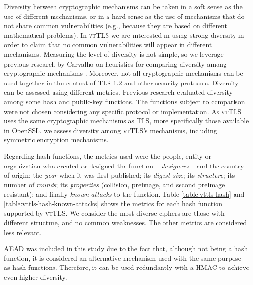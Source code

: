 \documentclass{sig-alternate-05-2015}
\begin{document}
Diversity between cryptographic mechanisms can be taken in a soft sense as the use of different mechanisms, or in a hard sense as the use of mechanisms that do not share common vulnerabilities (e.g., because they are based on different mathematical problems). In \textsc{vtTLS} we are interested in using strong diversity in order to claim that no common vulnerabilities will appear in different mechanisms. Measuring the level of diversity is not simple, so we leverage previous research by Carvalho on heuristics for comparing diversity among  cryptographic mechanisms \cite{CarvalhoThesis14}. Moreover, not all cryptographic mechanisms can be used together in the context of TLS 1.2 and other security protocols. 
Diversity can be assessed using different metrics. Previous research evaluated diversity among some hash and public-key functions. The functions subject to comparison were not chosen considering any specific protocol or implementation.
As \textsc{vtTLS} uses the same cryptographic mechanisms as TLS, more specifically those available in OpenSSL, we assess diversity among \textsc{vtTLS}'s mechanisms, including symmetric encryption mechanisms.


Regarding hash functions, the metrics used were the people, entity or organization who created or designed the function -- \textit{designers} -- and the country of origin; the \textit{year} when it was first published; its \textit{digest size}; its \textit{structure}; its number of \textit{rounds}; its \textit{properties} (collision, preimage, and second preimage resistant); and finally \textit{known attacks} to the function.
Table \ref{table:vttls-hash} and \ref{table:vttls-hash-known-attacks} shows the metrics for each hash function supported by \textsc{vtTLS}.
We consider the most diverse ciphers are those with different structure, and no common weaknesses. The other metrics are considered less relevant.

AEAD was included in this study due to the fact that, although not being a hash function, it is considered an alternative mechanism used with the same purpose as hash functions. Therefore, it can be used redundantly with a HMAC to achieve even higher diversity.
\end{document}
